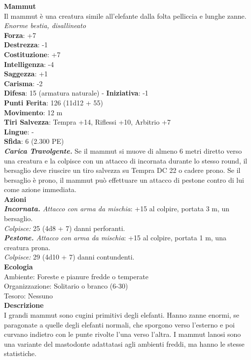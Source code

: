 \begin{multicols}{2}
\medskip\textbf{Mammut}\\
Il mammut è una creatura simile all'elefante dalla folta pelliccia e lunghe zanne.\\
\emph{Enorme bestia, disallineato}\\
\textbf{Forza}: +7\\
\textbf{Destrezza}: -1\\
\textbf{Costituzione}: +7\\
\textbf{Intelligenza}: -4\\
\textbf{Saggezza}: +1\\
\textbf{Carisma}: -2\\
\textbf{Difesa}: 15 (armatura naturale) - \textbf{Iniziativa}: -1\\
\textbf{Punti Ferita}: 126 (11d12 + 55)\\
\textbf{Movimento}: 12 m\\
\textbf{Tiri Salvezza}: Tempra +14, Riflessi +10, Arbitrio +7 \\
\textbf{Lingue}: -\\
\textbf{Sfida}: 6 (2.300 PE)\smallskip\\
\emph{\textbf{Carica Travolgente.}} Se il mammut si muove di almeno 6 metri diretto verso una creatura e la colpisce con un attacco di incornata durante lo stesso round, il bersaglio deve riuscire un tiro salvezza su Tempra DC  22 o cadere prono. Se il bersaglio è prono, il mammut può effettuare un attacco di pestone contro di lui come azione immediata.\\
\smallskip\textbf{Azioni}\\
\emph{\textbf{Incornata.} Attacco con arma da mischia}: +15 al colpire, portata 3 m, un bersaglio.\\
\emph{Colpisce:} 25 (4d8 + 7) danni perforanti.\\
\emph{\textbf{Pestone.} Attacco con arma da mischia}: +15 al colpire, portata 1 m, una creatura prona.\\
\emph{Colpisce:} 29 (4d10 + 7) danni contundenti.\\
\textbf{Ecologia}\\
Ambiente: Foreste e pianure fredde o temperate\\
Organizzazione: Solitario o branco (6-30)\\
Tesoro: Nessuno\\
\textbf{Descrizione}\\

I grandi mammut sono cugini primitivi degli elefanti. Hanno zanne enormi, se paragonate a quelle degli elefanti normali, che sporgono verso l'esterno e poi curvano indietro con le punte rivolte l'una verso l'altra. I mammut lanosi sono una variante del mastodonte adattatasi agli ambienti freddi, ma hanno le stesse statistiche. \\


\end{multicols}
